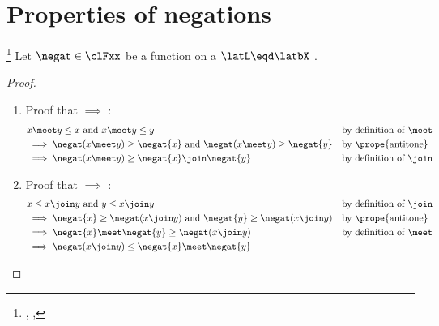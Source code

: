\section{Properties of negations}
\begin{lemma}
\footnote{
  ,
  ,
  }
\label{lem:latn_demorgan_ineq}
Let $\negat\in\clFxx$ be a function on a  $\latL\eqd\latbX$ .
\end{lemma}
\begin{proof}
\begin{enumerate}
  \item Proof that  $\implies$ : \label{item:latn_demorgan_xmeety}
    \begin{align*}
      &\text{$x\meet y\le x$ and $x\meet y\le y$}
        && \text{by definition of $\meet$}
      \\&\implies \text{$\negat(x\meet y)\ge \negat{x}$ and $\negat(x\meet y)\ge \negat{y}$}
        && \text{by \prope{antitone}}
      \\&\implies \negat(x\meet y)\ge \negat{x} \join \negat{y}
        && \text{by definition of $\join$}
    \end{align*}

  \item Proof that  $\implies$ : \label{item:latn_demorgan_xjoiny}
    \begin{align*}
      &\text{$x\le x\join y$ and $y\le x\join y$}
        && \text{by definition of $\join$}
      \\&\implies \text{$\negat{x}\ge\negat(x\join y)$ and $\negat{y}\ge\negat(x\join y)$}
        && \text{by \prope{antitone}}
      \\&\implies \negat{x} \meet \negat{y} \ge \negat(x\join y)
        && \text{by definition of $\meet$}
      \\&\implies \negat(x\join y) \le \negat{x} \meet \negat{y}
    \end{align*}
\end{enumerate}
\end{proof}    

